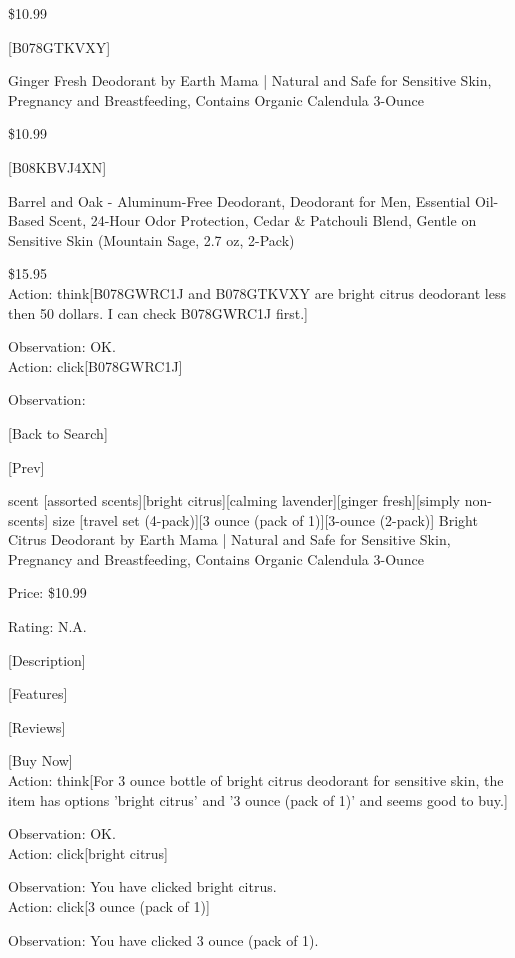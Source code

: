 \documentclass{article} \usepackage{iclr2024_conference,times}
\begin{document}
\$10.99 

[B078GTKVXY] 

Ginger Fresh Deodorant by Earth Mama | Natural and Safe for Sensitive Skin, Pregnancy and Breastfeeding, Contains Organic Calendula 3-Ounce 

\$10.99 

[B08KBVJ4XN] 

Barrel and Oak - Aluminum-Free Deodorant, Deodorant for Men, Essential Oil-Based Scent, 24-Hour Odor Protection, Cedar \& Patchouli Blend, Gentle on Sensitive Skin (Mountain Sage, 2.7 oz, 2-Pack) 

\$15.95  
\\

Action: think[B078GWRC1J and B078GTKVXY are bright citrus deodorant less then 50 dollars. I can check B078GWRC1J first.]

Observation: OK.
\\

Action: click[B078GWRC1J]

Observation: 

[Back to Search] 

[Prev] 

scent [assorted scents][bright citrus][calming lavender][ginger fresh][simply non-scents]
size [travel set (4-pack)][3 ounce (pack of 1)][3-ounce (2-pack)]
Bright Citrus Deodorant by Earth Mama | Natural and Safe for Sensitive Skin, Pregnancy and Breastfeeding, Contains Organic Calendula 3-Ounce 

Price: \$10.99 

Rating: N.A. 

[Description] 

[Features] 

[Reviews] 

[Buy Now]  
\\

Action: think[For 3 ounce bottle of bright citrus deodorant for sensitive skin, the item has options 'bright citrus' and '3 ounce (pack of 1)' and seems good to buy.]

Observation: OK.
\\

Action: click[bright citrus]

Observation: You have clicked bright citrus. 
\\

Action: click[3 ounce (pack of 1)]

Observation: You have clicked 3 ounce (pack of 1). 
\\
\end{document}
